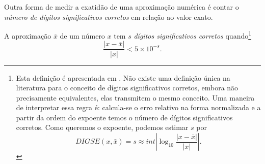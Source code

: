 Outra forma de medir a exatidão de uma aproximação numérica é contar o \emph{número de dígitos significativos corretos} em relação ao valor exato.

\begin{defn}\label{def:num_dig_sig_corretos}
A aproximação $\overline{x}$ de um número $x$ tem $s$ \emph{dígitos significativos corretos} quando\footnote{Esta definição é apresentada em \cite{Burden2013}. Não existe uma definição única na literatura para o conceito de dígitos significativos corretos, embora não precisamente equivalentes, elas transmitem o mesmo conceito.
Uma maneira de interpretar essa regra é: calcula-se o erro relativo na forma normalizada e a partir da ordem do expoente temos o número de dígitos significativos corretos. Como queremos o expoente, podemos estimar $s$ por
\begin{equation}  DIGSE(x,\bar{x})=s \approx int \left|\log_{10} \frac{|x-\overline{x}|}{|x|}\right|.  \end{equation}
}
$$
\frac{|x-\overline{x}|}{|x|} < 5\times 10^{-s}.
$$
\end{defn}


